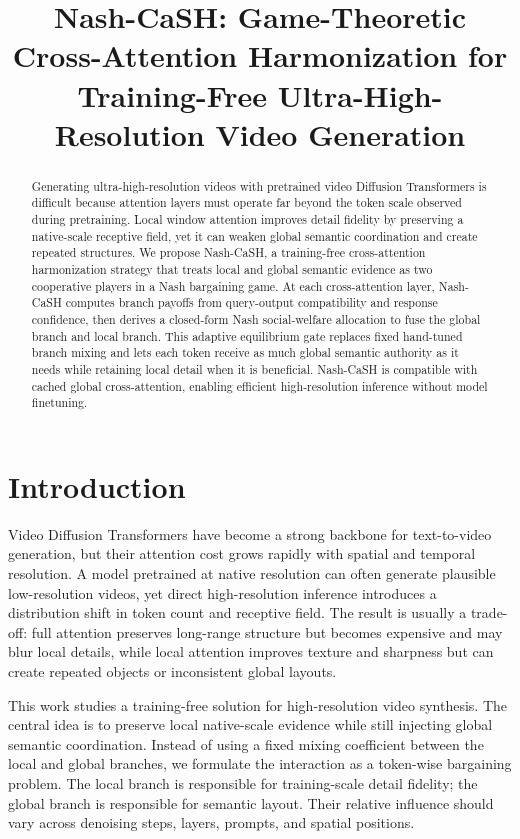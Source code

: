 \title{Nash-CaSH: Game-Theoretic Cross-Attention Harmonization for Training-Free Ultra-High-Resolution Video Generation}

\begin{abstract}
Generating ultra-high-resolution videos with pretrained video Diffusion Transformers is difficult because attention layers must operate far beyond the token scale observed during pretraining.
Local window attention improves detail fidelity by preserving a native-scale receptive field, yet it can weaken global semantic coordination and create repeated structures.
We propose Nash-CaSH, a training-free cross-attention harmonization strategy that treats local and global semantic evidence as two cooperative players in a Nash bargaining game.
At each cross-attention layer, Nash-CaSH computes branch payoffs from query-output compatibility and response confidence, then derives a closed-form Nash social-welfare allocation to fuse the global branch and local branch.
This adaptive equilibrium gate replaces fixed hand-tuned branch mixing and lets each token receive as much global semantic authority as it needs while retaining local detail when it is beneficial.
Nash-CaSH is compatible with cached global cross-attention, enabling efficient high-resolution inference without model finetuning.
\end{abstract}

\section{Introduction}

Video Diffusion Transformers have become a strong backbone for text-to-video generation, but their attention cost grows rapidly with spatial and temporal resolution.
A model pretrained at native resolution can often generate plausible low-resolution videos, yet direct high-resolution inference introduces a distribution shift in token count and receptive field.
The result is usually a trade-off: full attention preserves long-range structure but becomes expensive and may blur local details, while local attention improves texture and sharpness but can create repeated objects or inconsistent global layouts.

This work studies a training-free solution for high-resolution video synthesis.
The central idea is to preserve local native-scale evidence while still injecting global semantic coordination.
Instead of using a fixed mixing coefficient between the local and global branches, we formulate the interaction as a token-wise bargaining problem.
The local branch is responsible for training-scale detail fidelity; the global branch is responsible for semantic layout.
Their relative influence should vary across denoising steps, layers, prompts, and spatial positions.

